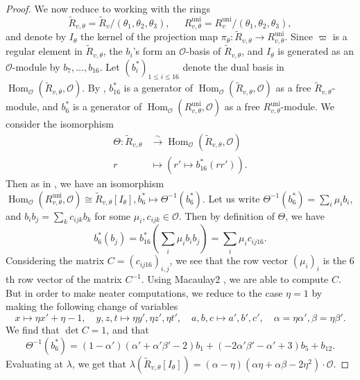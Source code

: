 \documentclass[a4paper, notitlepage, 10pt]{amsart}
\theoremstyle{plain} %
\theoremstyle{definition} %
\theoremstyle{remark} %
\numberwithin{equation}{section}
\newcommand{\Hom}{\operatorname{Hom}} %
\newcommand{\uni}{\operatorname{uni}}
\begin{document}
\begin{proof}
    We now reduce to working with the rings $$\widetilde{R}_{v,\theta}=\widetilde{R}_v/(\theta_1,\theta_2,\theta_3), \ \quad \ R^{\uni}_{v,\theta}=R^{\uni}_v/(\theta_1,\theta_2,\theta_3),$$
    and denote by $I_\theta$ the kernel of the projection map $\pi_\theta\colon \widetilde{R}_{v,\theta}\to R^{\uni}_{v,\theta}$. Since $\varpi$ is a regular element in $\widetilde{R}_{v,\theta}$, the $b_i$'s form an $\mathcal{O}$-basis of $\widetilde{R}_{v,\theta}$, and $I_{\theta}$ is generated as an $\mathcal{O}$-module by $b_7,\dots,b_{16}$. Let $(b_i^*)_{1\le i\le 16}$ denote the dual basis in $\Hom_{\mathcal{O}}(\widetilde{R}_{v,\theta},\mathcal{O})$. By \cite[Proposition 5.39]{BKM2}, $b_{16}^*$ is a generator of $\Hom_{\mathcal{O}}(\widetilde{R}_{v,\theta},\mathcal{O})$ as a free $\widetilde{R}_{v,\theta}$-module, and $b_6^*$ is a generator of $\Hom_{\mathcal{O}}(R^{\uni}_{v,\theta},\mathcal{O})$ as a free $R^{\uni}_{v,\theta}$-module. We consider the isomorphism 
    \begin{align*}
        \Theta\colon \widetilde{R}_{v,\theta} &\xrightarrow{\sim} \Hom_{\mathcal{O}}(\widetilde{R}_{v,\theta},\mathcal{O})
        \\ r&\mapsto (r'\mapsto b_{16}^*(rr')).
    \end{align*}
    Then as in \cite[p.2510]{BKM2}, we have an isomorphism $ \Hom_{\mathcal{O}}(R^{\uni}_{v,\theta},\mathcal{O})\cong \widetilde{R}_{v,\theta}[I_{\theta}], b_6^*\mapsto \Theta^{-1}(b_6^*)$. Let us write $\Theta^{-1}(b_6^*)=\sum_i \mu_i b_i$, and $b_ib_j=\sum_{k}c_{ijk}b_k$ for some $\mu_i,c_{ijk}\in \mathcal{O}$. Then by definition of $\Theta$, we have 
    $$ b_6^*(b_j)=b_{16}^*(\sum_i \mu_i b_ib_j)= \sum_{i}\mu_i c_{ij16}. $$
Considering the matrix $C=(c_{ij16})_{i,j}$, we see that the row vector $(\mu_i)_i$ is the $6$th row vector of the matrix $C^{-1}$. Using Macaulay2 \cite{M2}, we are able to compute $C$. 
But in order to make neater computations, we reduce to the case $\eta=1$ by making the following change of variables 
$$ x\mapsto \eta x'+\eta-1,\quad y,z,t\mapsto \eta y',\eta z',\eta t',\quad a,b,c\mapsto a',b',c',\quad \alpha=\eta\alpha',\beta= \eta \beta'. $$
We find that $\det C=1$, and that 
$$\Theta^{-1}(b^*_6)= (1-\alpha')(\alpha'+\alpha'\beta'-2)b_1+ (-2\alpha'\beta'-\alpha'+3)b_5+b_{12}.$$ Evaluating at $\lambda$, we get that $\lambda(\widetilde{R}_{v,\theta}[I_\theta])=(\alpha-\eta)(\alpha\eta+\alpha\beta-2\eta^2)\cdot\mathcal{O}$.


\end{proof}
\end{document}
